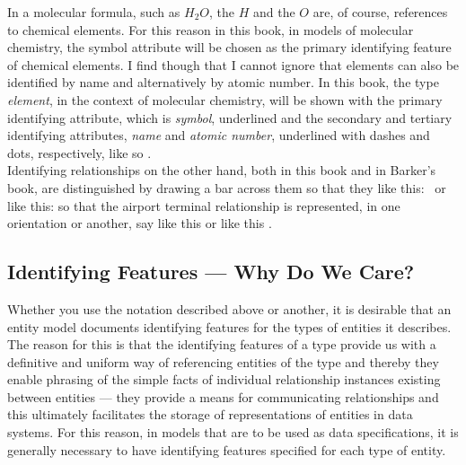 \mynote
In a molecular formula, such as $H_2O$, the $H$ and the $O$ are, of course, references to chemical elements. For this reason in this book,
in models of molecular chemistry, the symbol attribute will be chosen as the primary identifying feature of chemical elements. I find though that I cannot ignore that elements can also be identified by name and alternatively by atomic number. 
In this book, the type \textit{element}, in the context of molecular chemistry, will be shown with the primary identifying attribute, which is \textit{symbol}, underlined and the secondary and tertiary identifying attributes, \textit{name} and \textit{atomic number}, underlined with dashes and dots, respectively, like so
\raisebox{-0.85cm}{\scalebox{0.95}{}}.\\
\vspace{0.2cm}
\mynote Identifying relationships on the other hand, both in this book and in Barker's book,
are distinguished by drawing a bar across them so that they like this: \barkerEllisJ\ or like this: \barkerEllisK so that the airport terminal relationship is represented, 
in one orientation or another, say like this
\raisebox{-1.4cm}{\scalebox{0.9}{}} 
or like this \raisebox{-0.45cm}{\scalebox{0.9}{}}.

\subsection{Identifying Features --- Why Do We Care?}
 Whether you use the notation 
described above or another, it is desirable that an entity model documents identifying features for the types of entities it describes. 
The reason for this is that the identifying features of a type
provide us with a definitive and uniform way of referencing entities of the type 
and thereby they enable phrasing of  the simple facts of individual relationship instances
existing between entities  
--- they provide a means for communicating  relationships and this ultimately facilitates the storage of representations of entities in data systems. For this reason, in models that are to be used as data specifications, it is generally necessary to have identifying features specified for each type of entity.  
